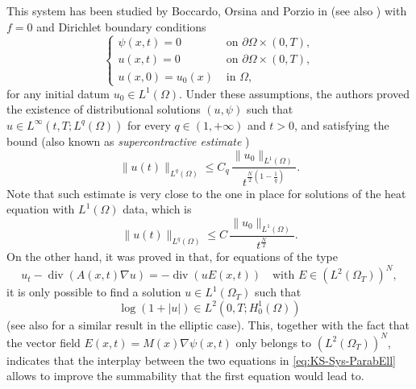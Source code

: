 \documentclass{amsart}
\numberwithin{equation}{section}
\def\elle#1{L^{#1}}
\def\elleom#1{L^{#1}(\Omega)}
\def\elleomT#1{L^{#1}(\Omega_T)}
\def\Hom{H^1_0(\Omega)}
\def\norma#1#2{ \|#1 \|_{#2}}
\newcommand{\abs}[1]{\left|#1\right|}
\begin{document}
This system has been studied by Boccardo, Orsina and Porzio in \cite{KSParabEll} (see also \cite{el_moutaouakil_numerical_2025}) with $f=0$ and Dirichlet boundary conditions
\begin{equation}
    \left\{\begin{array}{cc}
    \psi(x, t)=0 & \text { on } \partial\Omega\times(0, T), \\
    u(x, t)=0 & \text { on } \partial\Omega\times(0, T), \\
    u(x, 0)=u_0(x) & \text { in } \Omega,
    \end{array}\right.
\end{equation}
for any initial datum $u_0\in\elleom1$. 
Under these assumptions, the authors proved the existence of distributional solutions $(u,\psi)$ such that $u\in \elle\infty(t,T;\elleom q)$ for every $q\in(1,+\infty)$ and $t>0$, and satisfying the bound (also known as \emph{supercontractive estimate} \cite{porzio_decay_2009,porzio_uniform_2015})
\begin{equation}
    \norma{u(t)}{\elleom q}\leq C_q\,\frac{\norma{u_0}{\elleom1}}{t^{\frac{N}{2}\left(1-\frac1q\right)}}.
\end{equation}
Note that such estimate is very close to the one in place for solutions of the heat equation with $\elleom1$ data, which is
\[
\norma{u(t)}{\elleom q}\leq C\,\frac{\norma{u_0}{\elleom1}}{t^{\frac{N}{2}}}.
\]
On the other hand, it was proved in \cite{BOPorretta} that, for equations of the type 
\begin{equation}
    u_t-\operatorname{div}(A(x, t) \nabla u)=-\operatorname{div}(u E(x,t))\quad \text{with } E\in\left(\elleomT2\right)^N,
\end{equation}
it is only possible to find a solution $u\in\elleomT1$ such that 
\[\log(1+\abs{u})\in\elle2(0,T;\Hom)\]
(see also \cite{BoccardoJDE} for a similar result in the elliptic case).
This, together with the fact that the vector field $E(x,t)=M(x) \nabla \psi(x,t)$ only belongs to $\left(\elleomT2\right)^N$, indicates that the interplay between the two equations in \eqref{eq:KS-Sys-ParabEll} allows to improve the summability that the first equation would lead to.
\end{document}
